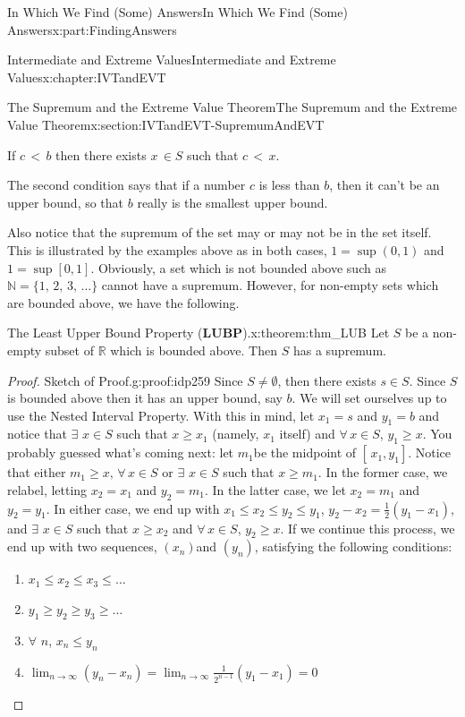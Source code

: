 \documentclass[oneside,10pt,]{book}
\newcommand{\terminology}[1]{\textbf{#1}}
\numberwithin{equation}{section}
\newcommand{\lt}{<}
\begin{document}
\begin{partptx}{In Which We Find (Some) Answers}{}{In Which We Find (Some) Answers}{}{}{x:part:FindingAnswers}
\begin{chapterptx}{Intermediate and Extreme Values}{}{Intermediate and Extreme Values}{}{}{x:chapter:IVTandEVT}
\begin{sectionptx}{The Supremum and the Extreme Value Theorem}{}{The Supremum and the Extreme Value Theorem}{}{}{x:section:IVTandEVT-SupremumAndEVT}
\begin{enumerate}[label=(\alph*)]
If \(c\,\lt \,b\) then there exists \(x\,\in S\) such that \(c\,\lt \,x\).%
\end{enumerate}
%
\par
The second condition says that if a number \(c\) is less than \(b\), then it can't be an upper bound, so that \(b\) really is the smallest upper bound.%
\par
Also notice that the supremum of the set may or may not be in the set itself. This is illustrated by the examples above as in both cases, \(1=\sup(0,1)\) and \(1=\sup [0,1]\). Obviously, a set which is not bounded above such as \(\mathbb{N}=\{1,\,2,\,3,\,\ldots\}\) cannot have a supremum. However, for non-empty sets which are bounded above, we have the following.%
\begin{theorem}{The Least Upper Bound Property (\terminology{LUBP}).}{}{x:theorem:thm_LUB}%
%
Let \(S\) be a non-empty subset of \(\mathbb{R}\) which is bounded above. Then \(S\) has a supremum.%
\end{theorem}
\begin{proof}{Sketch of Proof.}{g:proof:idp259}
Since \(S\neq\emptyset\), then there exists \(s\in S\). Since \(S\) is bounded above then it has an upper bound, say \(b\). We will set ourselves up to use the Nested Interval Property. With this in mind, let \(x_1=s\) and \(y_1=b\) and notice that \(\exists\) \(x\in S\) such that \(x\geq x_1\) (namely, \(x_1\) itself) and \(\forall\,x\in S\), \(y_1\geq x\). You probably guessed what's coming next: let \(m_1\)be the midpoint of \([\,x_1,y_1]\). Notice that either \(m_1\geq x,\,\forall\,x\in S\) or \(\exists\) \(x\in S\) such that \(x\geq m_1\). In the former case, we relabel, letting \(x_2=x_1\) and \(y_2=m_1\). In the latter case, we let \(x_2=m_1\) and \(y_2=y_1\). In either case, we end up with \(x_1\leq x_2\leq y_2\leq y_1\), \(y_2-x_2=\frac{1}{2}\left(y_1-x_1\right)\), and \(\exists\) \(x\in S\) such that \(x\geq x_2\) and \(\forall\,x\in S\), \(y_2\geq x\). If we continue this process, we end up with two sequences, \(\left(x_n\right)\)and \(\left(y_n\right)\), satisfying the following conditions:%
\begin{enumerate}
\item{}\(\displaystyle x_1\leq x_2\leq x_3\leq\ldots\)%
\item{}\(\displaystyle y_1\geq y_2\geq y_3\geq\ldots\)%
\item{}\(\forall\) \(n\), \(x_n\leq y_n\)%
\item{}\(\displaystyle \lim_{n\rightarrow\infty}\left(y_n-x_n\right)=\lim_{n\rightarrow\infty} \frac{1}{2^{n-1}}\left(y_1-x_1\right)=0\)%

\end{enumerate}
\end{proof}
\end{sectionptx}
\end{chapterptx}
\end{partptx}
\end{document}

